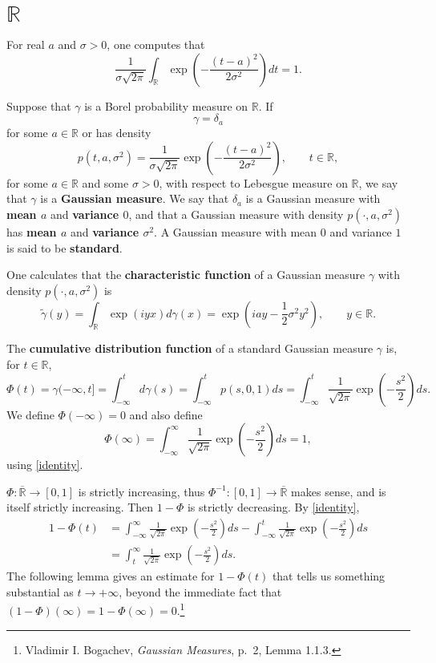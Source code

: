 \documentclass{article}
\theoremstyle{definition}
\begin{document}
\section{$\mathbb{R}$}
For real $a$ and $\sigma>0$, one computes that
\begin{equation}
\frac{1}{\sigma \sqrt{2\pi}} \int_{\mathbb{R}} \exp\left( - \frac{(t-a)^2}{2\sigma^2} \right) dt = 1.
\label{identity}
\end{equation}

Suppose that $\gamma$ is a Borel probability measure on $\mathbb{R}$. If 
\[
\gamma=\delta_a
\]
 for some
$a \in \mathbb{R}$ or has density
\[
p(t,a,\sigma^2) = \frac{1}{\sigma\sqrt{2\pi}}  \exp\left( - \frac{(t-a)^2}{2\sigma^2} \right),
\qquad t \in \mathbb{R},
\]
for some $a \in \mathbb{R}$ and some $\sigma>0$,
with respect to Lebesgue measure on $\mathbb{R}$, we say that $\gamma$ is a \textbf{Gaussian measure}.
We say that $\delta_a$ is a Gaussian measure with \textbf{mean $a$} and \textbf{variance $0$}, and
that a Gaussian measure with density $p(\cdot,a,\sigma^2)$ has \textbf{mean $a$} and \textbf{variance $\sigma^2$}.
A Gaussian measure with mean $0$ and variance $1$ is said to be \textbf{standard}.

One calculates that the \textbf{characteristic function} of a Gaussian measure $\gamma$ with density $p(\cdot,a,\sigma^2)$
is
\begin{equation}
\widetilde{\gamma}(y) = \int_{\mathbb{R}} \exp(i yx) d\gamma(x)
=\exp\left( iay - \frac{1}{2}\sigma^2 y^2 \right), \qquad y \in \mathbb{R}.
\label{characteristic}
\end{equation}

The \textbf{cumulative distribution function} of a standard Gaussian measure  $\gamma$ is, for
$t \in \mathbb{R}$,
\[
\Phi(t) = \gamma(-\infty,t] =\int_{-\infty}^t d\gamma(s) = 
\int_{-\infty}^t p(s,0,1) ds
=\int_{-\infty}^t \frac{1}{\sqrt{2\pi}} \exp\left(- \frac{s^2}{2} \right) ds.
\]
We define $\Phi(-\infty)=0$ and also define 
\[
\Phi(\infty) = \int_{-\infty}^\infty \frac{1}{\sqrt{2\pi}} \exp\left(- \frac{s^2}{2} \right) ds = 1,
\]
using \eqref{identity}.

$\Phi:\overline{\mathbb{R}} \to [0,1]$ is strictly increasing, thus 
$\Phi^{-1}:[0,1] \to \overline{\mathbb{R}}$ makes sense, and is itself strictly increasing. Then 
$1-\Phi$ is strictly decreasing.
By \eqref{identity},
\begin{align*}
1-\Phi(t) &=  \int_{-\infty}^\infty \frac{1}{\sqrt{2\pi}} \exp\left( - \frac{s^2}{2} \right) ds
-\int_{-\infty}^t \frac{1}{\sqrt{2\pi}} \exp\left(- \frac{s^2}{2} \right) ds\\
&=\int_t^\infty \frac{1}{\sqrt{2\pi}} \exp\left(- \frac{s^2}{2} \right) ds.
\end{align*}
The following lemma gives an estimate for
$1-\Phi(t)$ that tells us something substantial as $t \to +\infty$, beyond the immediate fact that $(1-\Phi)(\infty)=1-\Phi(\infty)=0$.\footnote{Vladimir I. Bogachev,
{\em Gaussian Measures}, p.~2, Lemma 1.1.3.}
\end{document}
